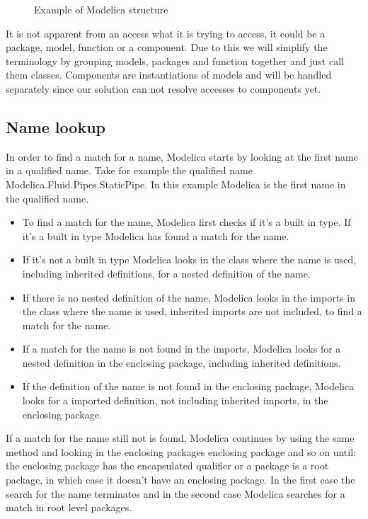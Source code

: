 \documentclass{cslthse-msc}
\begin{document}
\begin{figure}[!htbp]
    \centering
    \qquad
    \subfloat{\raisebox{3.2 cm}{}}
    \caption{Example of Modelica structure}
    \label{fig:modelicaExample}
\end{figure}

It is not apparent from an access what it is trying to access, it could be a package, model, function or a component. Due to this we will simplify the terminology by grouping models, packages and function together and just call them classes. Components are instantiations of models and will be handled separately since our solution can not resolve accesses to components yet.

\subsection{Name lookup}
In order to find a match for a name, Modelica starts by looking at the first name in a qualified name. Take for example the qualified name Modelica.Fluid.Pipes.StaticPipe. In this example Modelica is the first name in the qualified name.
\begin{itemize}
\item To find a match for the name, Modelica first checks if it's a built in type. If it's a built in type Modelica has found a match for the name.

\item If it's not a built in type Modelica looks in the class where the name is used, including inherited definitions, for a nested definition of the name. 

\item If there is no nested definition of the name, Modelica looks in the imports in the class where the name is used, inherited imports are not included, to find a match for the name.

\item If a match for the name is not found in the imports, Modelica looks for a nested definition in the enclosing package, including inherited definitions.

\item If the definition of the name is not found in the enclosing package, Modelica looks for a imported definition, not including inherited imports, in the enclosing package.
\end{itemize}
If a match for the name still not is found, Modelica continues by using the same method and looking in the enclosing packages enclosing package and so on until: the enclosing package has the encapsulated qualifier or a package is a root package, in which case it doesn't have an enclosing package. In the first case the search for the name terminates and in the second case Modelica searches for a match in root level packages.
\end{document}
